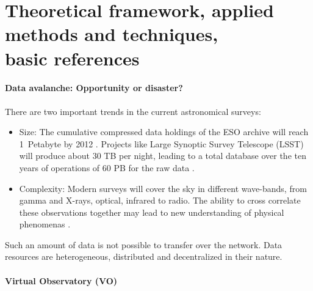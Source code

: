 \newpage
\section{Theoretical framework, applied methods and techniques,\\ basic references}
\paragraph{Data avalanche: Opportunity or disaster?}

\bigskip


There are two important trends in the current astronomical surveys:

\begin{itemize}

  \item{Size:} The cumulative compressed data holdings of the ESO archive will
    reach 1~Petabyte by 2012 \cite{hanisch2010international}. Projects
    like Large Synoptic Survey Telescope (LSST) will produce about 30
    TB per night, leading to a total database over the ten years of
    operations of 60 PB for the raw data \cite{becla2006designing}.
   
  \item{Complexity:} Modern surveys will cover the sky in different
    wave-bands, from gamma and X-rays, optical, infrared to radio. The
    ability to cross correlate these observations together may lead to
    new understanding of physical
    phenomenas \cite{hanisch2010international}.
\end{itemize}



\noindent Such an amount of data is not possible to transfer over the
network. Data resources are heterogeneous, distributed and
decentralized in their nature.

\paragraph{Virtual Observatory (VO)}

